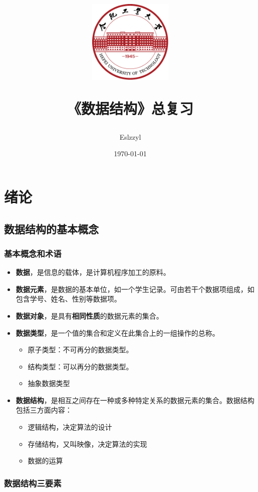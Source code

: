 \documentclass[12pt, a4paper, oneside]{ctexart}
\title{
    \includegraphics[width=0.3\textwidth]{images/hfut-badge.pdf}
    
    \vspace{20pt}
    《数据结构》总复习
}
\author{Eslzzyl}
\date{\today}
\begin{document}
\maketitle
\newpage
\tableofcontents
\vspace{20pt}

\newpage

\section{绪论}

\subsection{数据结构的基本概念}

\subsubsection{基本概念和术语}

\begin{itemize}
  \item {\bf 数据}，是信息的载体，是计算机程序加工的原料。
  \item {\bf 数据元素}，是数据的基本单位，如一个学生记录。可由若干个数据项组成，如包含学号、姓名、性别等数据项。
  \item {\bf 数据对象}，是具有\textbf{相同性质}的数据元素的集合。
  \item {\bf 数据类型}，是一个值的集合和定义在此集合上的一组操作的总称。
  \begin{itemize}
    \item 原子类型：不可再分的数据类型。
    \item 结构类型：可以再分的数据类型。
    \item 抽象数据类型
  \end{itemize}
  \item {\bf 数据结构}，是相互之间存在一种或多种特定关系的数据元素的集合。数据结构包括三方面内容：
  \begin{itemize}
    \item 逻辑结构，决定算法的设计
    \item 存储结构，又叫映像，决定算法的实现
    \item 数据的运算
  \end{itemize}
\end{itemize}

\subsubsection{数据结构三要素}
\end{document}
